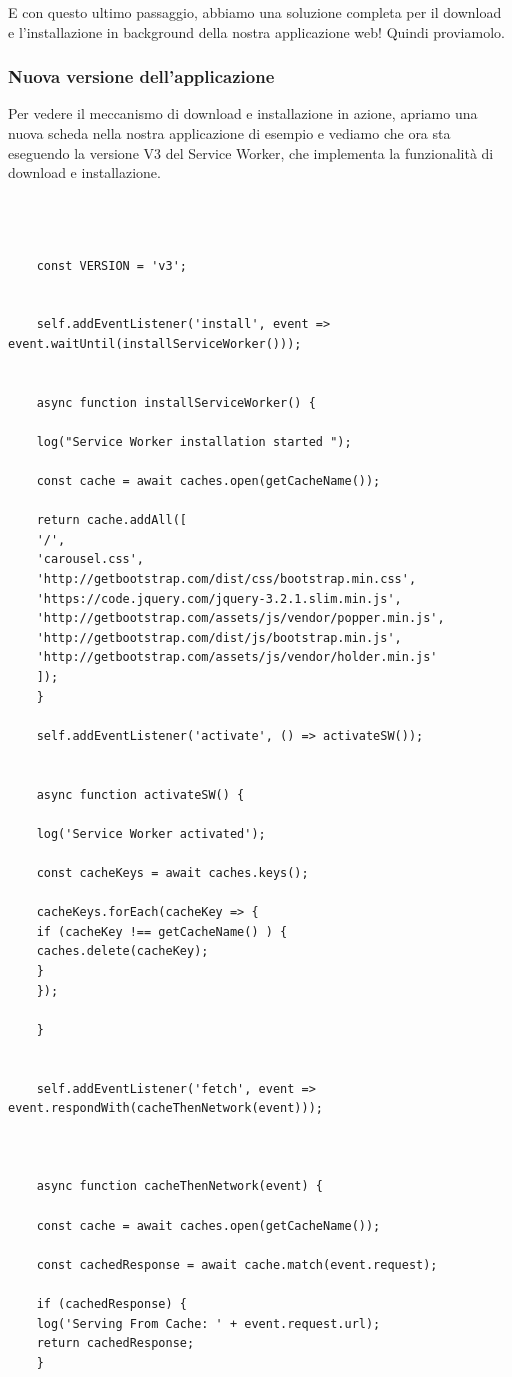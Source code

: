 \documentclass[italian]{article}
\begin{document}
E con questo ultimo passaggio, abbiamo una soluzione completa per il download e l'installazione in background della nostra applicazione web! Quindi proviamolo.
\subsubsection{Nuova versione dell'applicazione}
Per vedere il meccanismo di download e installazione in azione, apriamo una nuova scheda nella nostra applicazione di esempio e vediamo che ora sta eseguendo la versione V3 del Service Worker, che implementa la funzionalità di download e installazione.
\begin{lstlisting}
	
	
	
	const VERSION = 'v3';
	
	
	self.addEventListener('install', event => event.waitUntil(installServiceWorker()));
	
	
	async function installServiceWorker() {
	
	log("Service Worker installation started ");
	
	const cache = await caches.open(getCacheName());
	
	return cache.addAll([
	'/',
	'carousel.css',
	'http://getbootstrap.com/dist/css/bootstrap.min.css',
	'https://code.jquery.com/jquery-3.2.1.slim.min.js',
	'http://getbootstrap.com/assets/js/vendor/popper.min.js',
	'http://getbootstrap.com/dist/js/bootstrap.min.js',
	'http://getbootstrap.com/assets/js/vendor/holder.min.js'
	]);
	}
	
	self.addEventListener('activate', () => activateSW());
	
	
	async function activateSW() {
	
	log('Service Worker activated');
	
	const cacheKeys = await caches.keys();
	
	cacheKeys.forEach(cacheKey => {
	if (cacheKey !== getCacheName() ) {
	caches.delete(cacheKey);
	}
	});
	
	}
	
	
	self.addEventListener('fetch', event => event.respondWith(cacheThenNetwork(event)));
	
	
	
	async function cacheThenNetwork(event) {
	
	const cache = await caches.open(getCacheName());
	
	const cachedResponse = await cache.match(event.request);
	
	if (cachedResponse) {
	log('Serving From Cache: ' + event.request.url);
	return cachedResponse;
	}
	

\end{lstlisting}
\end{document}
